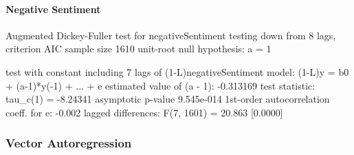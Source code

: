 \paragraph{Negative Sentiment}

Augmented Dickey-Fuller test for negativeSentiment
testing down from 8 lags, criterion AIC
sample size 1610
unit-root null hypothesis: a = 1

test with constant 
including 7 lags of (1-L)negativeSentiment
model: (1-L)y = b0 + (a-1)*y(-1) + ... + e
estimated value of (a - 1): -0.313169
test statistic: tau\_c(1) = -8.24341
asymptotic p-value 9.545e-014
1st-order autocorrelation coeff. for e: -0.002
lagged differences: F(7, 1601) = 20.863 [0.0000]

\subsubsection{Vector Autoregression}

